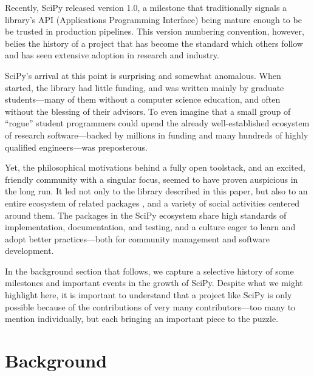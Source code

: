 \documentclass[fleqn,10pt]{wlscirep}
\begin{document}
Recently, SciPy released version 1.0, a milestone that traditionally
signals a library's API (Applications Programming Interface) being
mature enough to be be trusted in production pipelines. This version 
numbering convention, however, belies the history of a project that has
become the standard which others follow and has seen extensive
adoption in research and industry.

SciPy's arrival at this point is surprising and somewhat anomalous.
When started, the library had little funding, and was written mainly
by graduate students---many of them without a computer science education, and often without the
blessing of their advisors.  To even imagine that a small group of
``rogue'' student programmers could upend the already well-established
ecosystem of research software---backed by millions in funding and
many hundreds of highly qualified engineers\cite{mathworks-globe-97,
esri-revenue,bloom-wolfram}---was preposterous.

Yet, the philosophical motivations behind a fully open toolstack, and
an excited, friendly community with a singular focus, seemed to have
proven auspicious in the long run.  It led not only to the library
described in this paper, but also to an entire ecosystem of related
packages \cite{scipy-ecosystem}, and a variety of social activities centered around
them\cite{social-python}. The packages in the SciPy ecosystem 
share high standards of implementation,
documentation, and testing, and a culture eager to learn and adopt
better practices---both for community management and software
development.


In the background section that follows, we capture a selective history
of some milestones and important events in the growth of SciPy.
Despite what we might highlight here, it is important to understand
that a project like SciPy is only possible because of the
contributions of very many contributors---too many to mention
individually, but each bringing an important piece to the puzzle.

\section*{Background}
\end{document}
